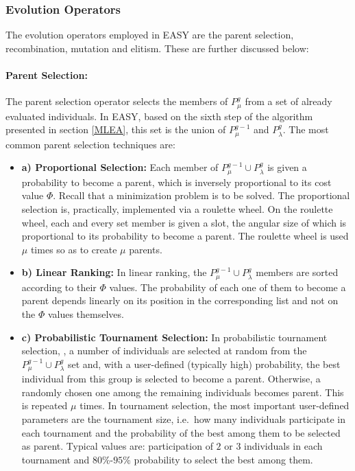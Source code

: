 \subsubsection{Evolution Operators}
\label{evOps}
The evolution operators employed in EASY are the parent selection,  recombination, mutation and  elitism. These are further discussed below: 
   
\paragraph{Parent Selection:}
The parent selection operator selects the members of $P_{\mu}^{g}$ from a set of already evaluated individuals. In EASY, based on the sixth step of the  algorithm presented in section \ref{MLEA}, this set is the union of $P_{\mu}^{g-1}$ and $P_{\lambda}^g$. The most common parent selection techniques  \cite{Back1996} are: 
\begin{itemize}
\item[]{\bf a) Proportional Selection:} Each member of $P_{\mu}^{g-1} \cup P_{\lambda}^g$ is given a probability to become a parent, which is inversely proportional to its cost value $\Phi$. Recall that a minimization problem is to be solved. The proportional selection is, practically, implemented via a roulette wheel. On the roulette wheel, each and every set member is given a slot, the angular size of which is proportional to its probability to become a parent. The roulette wheel is used $\mu$ times so as to create $\mu$ parents.  
\item[]{\bf b) Linear Ranking:} In linear ranking, the $P_{\mu}^{g-1} \cup P_{\lambda}^g$ members are sorted according to their $\Phi$ values. The probability of each one of them to become a parent depends linearly on its position in the corresponding list and not on the $\Phi$ values themselves.
\item[]{\bf c) Probabilistic Tournament Selection:}
In probabilistic tournament selection, \cite{goldberg1991}, a number of individuals are selected at random from the $P_{\mu}^{g-1} \cup P_{\lambda}^g$ set and, with a user-defined (typically high) probability, the best individual from this group is selected to become a parent. Otherwise, a randomly chosen one among the remaining individuals becomes parent. This is repeated $\mu$ times. In tournament selection, the most important user-defined parameters are the tournament size, i.e.\ how many individuals participate in each tournament and the probability of the best among them to be selected as parent. Typical values are: participation of $2$ or $3$ individuals in each tournament and $80\%$-$95\%$ probability to select the best among them.
\end{itemize}


